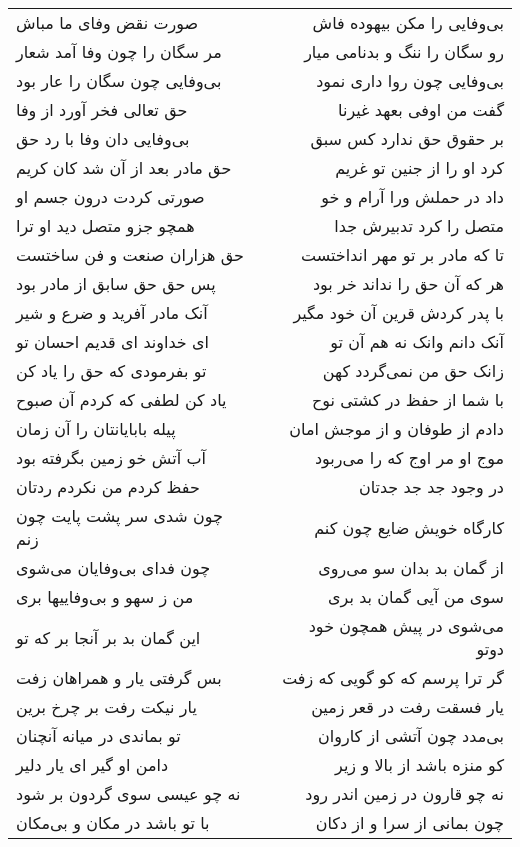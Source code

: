 \begin{center}
\begin{longtable}{l p{0.5cm} r}
صورت نقض وفای ما مباش
&&
بی‌وفایی را مکن بیهوده فاش
\\
مر سگان را چون وفا آمد شعار
&&
رو سگان را ننگ و بدنامی میار
\\
بی‌وفایی چون سگان را عار بود
&&
بی‌وفایی چون روا داری نمود
\\
حق تعالی فخر آورد از وفا
&&
گفت من اوفی بعهد غیرنا
\\
بی‌وفایی دان وفا با رد حق
&&
بر حقوق حق ندارد کس سبق
\\
حق مادر بعد از آن شد کان کریم
&&
کرد او را از جنین تو غریم
\\
صورتی کردت درون جسم او
&&
داد در حملش ورا آرام و خو
\\
همچو جزو متصل دید او ترا
&&
متصل را کرد تدبیرش جدا
\\
حق هزاران صنعت و فن ساختست
&&
تا که مادر بر تو مهر انداختست
\\
پس حق حق سابق از مادر بود
&&
هر که آن حق را نداند خر بود
\\
آنک مادر آفرید و ضرع و شیر
&&
با پدر کردش قرین آن خود مگیر
\\
ای خداوند ای قدیم احسان تو
&&
آنک دانم وانک نه هم آن تو
\\
تو بفرمودی که حق را یاد کن
&&
زانک حق من نمی‌گردد کهن
\\
یاد کن لطفی که کردم آن صبوح
&&
با شما از حفظ در کشتی نوح
\\
پیله بابایانتان را آن زمان
&&
دادم از طوفان و از موجش امان
\\
آب آتش خو زمین بگرفته بود
&&
موج او مر اوج که را می‌ربود
\\
حفظ کردم من نکردم ردتان
&&
در وجود جد جد جدتان
\\
چون شدی سر پشت پایت چون زنم
&&
کارگاه خویش ضایع چون کنم
\\
چون فدای بی‌وفایان می‌شوی
&&
از گمان بد بدان سو می‌روی
\\
من ز سهو و بی‌وفاییها بری
&&
سوی من آیی گمان بد بری
\\
این گمان بد بر آنجا بر که تو
&&
می‌شوی در پیش همچون خود دوتو
\\
بس گرفتی یار و همراهان زفت
&&
گر ترا پرسم که کو گویی که زفت
\\
یار نیکت رفت بر چرخ برین
&&
یار فسقت رفت در قعر زمین
\\
تو بماندی در میانه آنچنان
&&
بی‌مدد چون آتشی از کاروان
\\
دامن او گیر ای یار دلیر
&&
کو منزه باشد از بالا و زیر
\\
نه چو عیسی سوی گردون بر شود
&&
نه چو قارون در زمین اندر رود
\\
با تو باشد در مکان و بی‌مکان
&&
چون بمانی از سرا و از دکان

\end{longtable}
\end{center}
